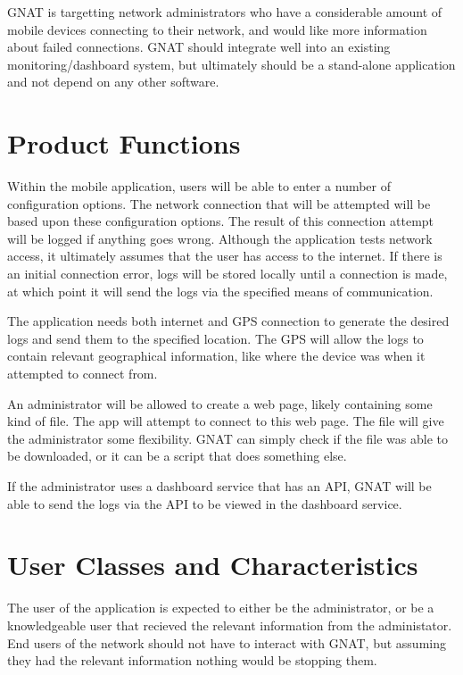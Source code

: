 \documentclass{scrreprt}
\begin{document}
GNAT is targetting network administrators who have a considerable amount of mobile devices connecting to their network, and would like more information about failed connections.  GNAT should integrate well into an existing monitoring/dashboard system, but ultimately should be a stand-alone application and not depend on any other software.


\section{Product Functions}

Within the mobile application, users will be able to enter a number of configuration options.  The network connection that will be attempted will be based upon these configuration options.  The result of this connection attempt will be logged if anything goes wrong. Although the application tests network access, it ultimately assumes that the user has access to the internet.  If there is an initial connection error, logs will be stored locally until a connection is made, at which point it will send the logs via the specified means of communication.

The application needs both internet and GPS connection to generate the desired logs and send them to the specified location.  The GPS will allow the logs to contain relevant geographical information, like where the device was when it attempted to connect from.

An administrator will be allowed to create a web page, likely containing some kind of file.  The app will attempt to connect to this web page.  The file will give the administrator some flexibility. GNAT can simply check if the file was able to be downloaded, or it can be a script that does something else.  

If the administrator uses a dashboard service that has an API, GNAT will be able to send the logs via the API to be viewed in the dashboard service.
 
\section{User Classes and Characteristics}
The user of the application is expected to either be the administrator, or be a knowledgeable user that recieved the relevant information from the administator.  End users of the network should not have to interact with GNAT, but assuming they had the relevant information nothing would be stopping them.
\end{document}
